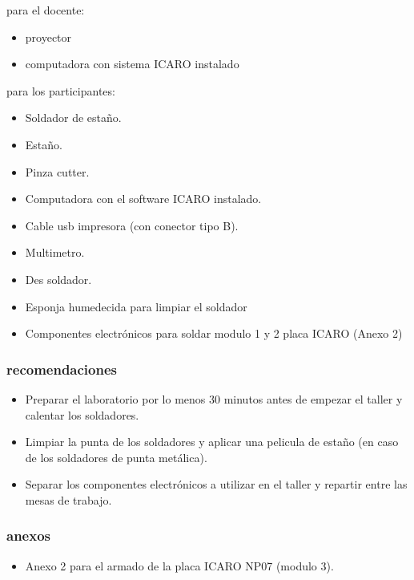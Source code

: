 para el docente:
\begin{itemize}
  \item proyector
  \item computadora con sistema ICARO instalado
\end{itemize}
para los participantes:
\begin{itemize}
  \item Soldador de estaño.
  \item Estaño.
  \item Pinza cutter.
  \item Computadora con el software ICARO instalado.
  \item Cable usb impresora (con conector tipo B).
  \item Multimetro.
  \item Des soldador.
  \item Esponja humedecida para limpiar el soldador
  \item Componentes electrónicos para soldar modulo 1 y 2 placa ICARO (Anexo 2) 
\end{itemize}

\subsubsection{recomendaciones}

\begin{itemize}
  \item Preparar el laboratorio por lo menos 30 minutos antes de empezar el taller y calentar los soldadores.

  \item Limpiar la punta de los soldadores y aplicar una pelicula de estaño (en caso de los soldadores de punta metálica).

  \item Separar los componentes electrónicos a utilizar en el taller y repartir entre las mesas de trabajo.

\end{itemize}
\subsubsection{anexos}
\begin{itemize}
  \item Anexo 2 para el armado de la placa ICARO NP07 (modulo 3).
\end{itemize}
